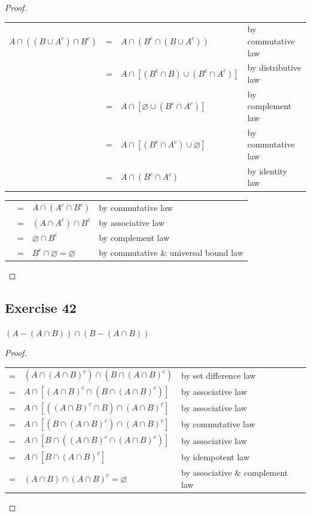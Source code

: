 \documentclass[14pt]{extarticle}
\newcommand{\es}{\varnothing}
\newcommand{\cy}{\color{cyan}}
\begin{document}
\begin{proof}
\begin{center}
\begin{tabular}{rcll}
\(A \cap ((B \cup A^c) \cap B^c)\) & = & \(A \cap (B^c \cap (B \cup A^c))\) & {\cy by commutative law} \\
& = & \(A \cap [(B^c \cap B) \cup (B^c \cap A^c)]\) & {\cy by distributive law} \\
& = & \(A \cap [\es \cup (B^c \cap A^c)]\) & {\cy by complement law} \\
& = & \(A \cap [(B^c \cap A^c) \cup \es]\) & {\cy by commutative law} \\
& = & \(A \cap (B^c \cap A^c)\) & {\cy by identity law}
\end{tabular}
\end{center}
\begin{center}
\begin{tabular}{rcll}
& = & \(A \cap (A^c \cap B^c)\) & {\cy by commutative law} \\
& = & \((A \cap A^c) \cap B^c\) & {\cy by associative law} \\
& = & \(\es \cap B^c\) & {\cy by complement law} \\
& = & \(B^c \cap \es = \es\) & {\cy by commutative \& universal bound law}
\end{tabular}
\end{center}
\end{proof}

\subsection{Exercise 42}
\((A - (A \cap B)) \cap (B - (A \cap B))\)

\begin{proof}
\begin{tabular}{cll}
= & \((A \cap (A \cap B)^c) \cap (B \cap (A \cap B)^c)\) & {\cy by set difference law} \\
= & \(A \cap [(A \cap B)^c \cap (B \cap (A \cap B)^c)]\) & {\cy by associative law} \\
= & \(A \cap [((A \cap B)^c \cap B) \cap (A \cap B)^c]\) & {\cy by associative law} \\
= & \(A \cap [(B \cap (A \cap B)^c) \cap (A \cap B)^c]\) & {\cy by commutative law} \\
= & \(A \cap [B \cap ((A \cap B)^c \cap (A \cap B)^c)]\) & {\cy by associative law} \\
= & \(A \cap [B \cap (A \cap B)^c]\) & {\cy by idempotent law} \\
= & \((A \cap B) \cap (A \cap B)^c = \es\) & {\cy by associative \& complement law}
\end{tabular}
\end{proof}
\end{document}
